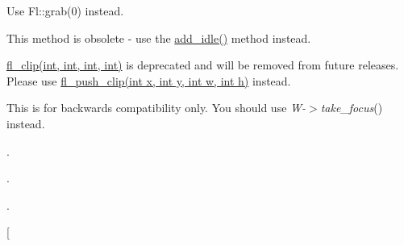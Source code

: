 
\begin{DoxyRefList}
\item[\label{deprecated__deprecated000002}%
\Hypertarget{deprecated__deprecated000002}%
Member \hyperlink{class_fl_a656023b0db49ae9b88e277ccdb27ce1b}{Fl\+:\+:release} ()]Use Fl\+::grab(0) instead.  
\item[\label{deprecated__deprecated000001}%
\Hypertarget{deprecated__deprecated000001}%
Member \hyperlink{class_fl_a77955ad2f2b83fc5e3925b94e4533b20}{Fl\+:\+:set\+\_\+idle} (Fl\+\_\+\+Old\+\_\+\+Idle\+\_\+\+Handler cb)]This method is obsolete -\/ use the \hyperlink{class_fl_a42d6e5121c18ed1a422fbb02993cf900}{add\+\_\+idle()} method instead.  
\item[\label{deprecated__deprecated000003}%
\Hypertarget{deprecated__deprecated000003}%
Member \hyperlink{group__fl__drawings_ga0061bafa4252431de247713975e4c3ef}{fl\+\_\+clip} ]\hyperlink{group__fl__drawings_ga0061bafa4252431de247713975e4c3ef}{fl\+\_\+clip(int, int, int, int)} is deprecated and will be removed from future releases. Please use \hyperlink{group__fl__drawings_gabe60242ba3b975800717b95cb6bc06d2}{fl\+\_\+push\+\_\+clip(int x, int y, int w, int h)} instead.  
\item[\label{deprecated__deprecated000004}%
\Hypertarget{deprecated__deprecated000004}%
Member \hyperlink{class_fl___group_a53cdffb97187987a624c1b71cc38ad3a}{Fl\+\_\+\+Group\+:\+:focus} (\hyperlink{class_fl___widget}{Fl\+\_\+\+Widget} $\ast$W)]This is for backwards compatibility only. You should use {\itshape W-\/$>$take\+\_\+focus}() instead.  
\item[\label{deprecated__deprecated000006}%
\Hypertarget{deprecated__deprecated000006}%
Member \hyperlink{struct_fl___menu___item_a7b762f887849570b33309537ce2d5fd4}{Fl\+\_\+\+Menu\+\_\+\+Item\+:\+:check} ()].  
\item[\label{deprecated__deprecated000005}%
\Hypertarget{deprecated__deprecated000005}%
Member \hyperlink{struct_fl___menu___item_a3ab5231b3f7785113ff57210b00f692a}{Fl\+\_\+\+Menu\+\_\+\+Item\+:\+:checked} () const].  
\item[\label{deprecated__deprecated000007}%
\Hypertarget{deprecated__deprecated000007}%
Member \hyperlink{struct_fl___menu___item_ae89657ebc69eebd87a0ed10a730ce941}{Fl\+\_\+\+Menu\+\_\+\+Item\+:\+:uncheck} ()].  
\item[\label{deprecated__deprecated000008}%
\Hypertarget{deprecated__deprecated000008}%
Member \hyperlink{class_fl___spinner_abee4b9eab726c7b88a946751118ae7d2}{Fl\+\_\+\+Spinner\+:\+:maxinum} () const]
\item[\label{deprecated__deprecated000009}%

\end{DoxyRefList}
